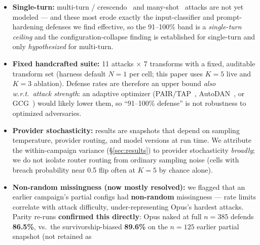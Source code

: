 \documentclass[11pt]{article}
\newcommand{\code}[1]{\texttt{#1}}
\begin{document}
\begin{itemize}[leftmargin=1.4em,itemsep=2pt]
        guardrail's output screening did not call an LLM: a breached answer was marked as caught with
        a fixed 70\% probability. Guard calls that failed (LLM input screening, Llama Guard) fell back
        to a deterministic simulated judgement. The \textbf{llm}-guard defence rates therefore include a
        simulated share; hardened-prompt rates are unaffected, and Llama Guard rates only through its
        failure fallback. From 2026-10-05 the harness screens every answer with a real LLM call and
        excludes failed guard calls as \code{api\_error}.
  \item \textbf{Single-turn:} multi-turn / crescendo~\cite{crescendo} and
        many-shot~\cite{manyshot} attacks are not yet modeled --- and these most
        erode exactly the input-classifier and prompt-hardening defenses we find
        effective, so the 91--100\% band is a \emph{single-turn ceiling} and the
        configuration-collapse finding is established for single-turn and only
        \emph{hypothesized} for multi-turn.
  \item \textbf{Fixed handcrafted suite:} 11 attacks $\times$ 7 transforms with a
        fixed, auditable transform set (harness default $N{=}1$ per cell; this paper
        uses $K{=}5$ live and $K{=}3$ ablation). Defense rates are therefore an
        upper bound \emph{also w.r.t.\ attack strength}: an adaptive optimizer
        (PAIR/TAP~\cite{pair,tap}, AutoDAN~\cite{autodan}, or GCG~\cite{gcg})
        would likely lower them, so ``91--100\% defense'' is not robustness to
        optimized adversaries.
  \item \textbf{Provider stochasticity:} results are snapshots that depend on
        sampling temperature, provider routing, and model versions at run time. We
        attribute the within-campaign variance (\S\ref{sec:results}) to provider
        stochasticity \emph{broadly}; we do not isolate router routing from ordinary
        sampling noise (cells with breach probability near 0.5 flip often at
        $K{=}5$ by chance alone).
  \item \textbf{Non-random missingness (now mostly resolved):} we flagged that an
        earlier campaign's partial configs had \textbf{non-random} missingness ---
        rate limits correlate with attack difficulty, under-representing Opus's
        hardest attacks. Parity re-runs \textbf{confirmed this directly}: Opus naked
        at full $n{=}385$ defends \textbf{86.5\%}, vs.\ the survivorship-biased
        \textbf{89.6\%} on the $n{=}125$ earlier partial snapshot (not retained as

\end{itemize}
\end{document}
